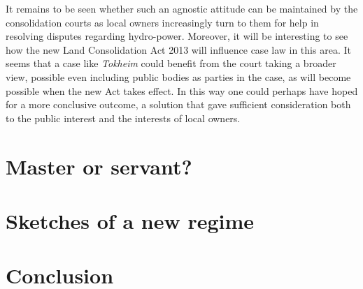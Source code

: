 It remains to be seen whether such an agnostic attitude can be maintained by the consolidation courts as local owners increasingly turn to them for help in resolving disputes regarding hydro-power. Moreover, it will be interesting to see how the new Land Consolidation Act 2013 will influence case law in this area. It seems that a case like \emph{Tokheim} could benefit from the court taking a broader view, possible even including public bodies as parties in the case, as will become possible when the new Act takes effect. In this way one could perhaps have hoped for a more conclusive outcome, a solution that gave sufficient consideration both to the public interest and the interests of local owners.

\section{Master or servant?}

\section{Sketches of a new regime}

\section{Conclusion}